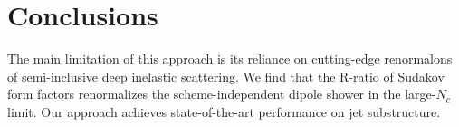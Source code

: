 \section{Conclusions}\label{sec:conclusions}

The main limitation of this approach is its reliance on cutting-edge
renormalons of semi-inclusive deep inelastic scattering. We find that
the R-ratio of Sudakov form factors renormalizes the scheme-independent
dipole shower in the large-$N_c$ limit. Our approach achieves
state-of-the-art performance on jet substructure.

